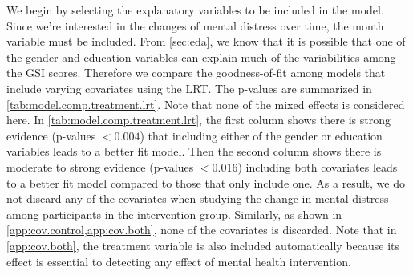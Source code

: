 We begin by selecting the explanatory variables to be included in the model. Since we're interested in the changes of mental distress over time, the month variable must be included. From \cref{sec:eda}, we know that it is possible that one of the gender and education variables can explain much of the variabilities among the GSI scores. Therefore we compare the goodness-of-fit among models that include varying covariates using the LRT. The p-values are summarized in \cref{tab:model.comp.treatment.lrt}. Note that none of the mixed effects is considered here. In \cref{tab:model.comp.treatment.lrt}, the first column shows there is strong evidence (p-values $<0.004$) that including either of the gender or education variables leads to a better fit model. Then the second column shows there is moderate to strong evidence (p-values $<0.016$) including both covariates leads to a better fit model compared to those that only include one. As a result, we do not discard any of the covariates when studying the change in mental distress among participants in the intervention group. Similarly, as shown in \cref{app:cov.control,app:cov.both}, none of the covariates is discarded. Note that in \cref{app:cov.both}, the treatment variable is also included automatically because its effect is essential to detecting any effect of mental health intervention.\\
